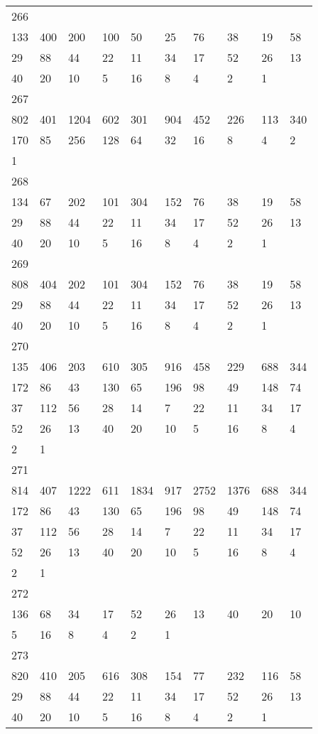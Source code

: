 \begin{longtable}{*{10}{l}}
266&&&&&&&&&\\
133& 400& 200& 100& 50& 25& 76& 38& 19& 58\\
29& 88& 44& 22& 11& 34& 17& 52& 26& 13\\
40& 20& 10& 5& 16& 8& 4& 2& 1& \\

267&&&&&&&&&\\
802& 401& 1204& 602& 301& 904& 452& 226& 113& 340\\
170& 85& 256& 128& 64& 32& 16& 8& 4& 2\\
1& \\

268&&&&&&&&&\\
134& 67& 202& 101& 304& 152& 76& 38& 19& 58\\
29& 88& 44& 22& 11& 34& 17& 52& 26& 13\\
40& 20& 10& 5& 16& 8& 4& 2& 1& \\

269&&&&&&&&&\\
808& 404& 202& 101& 304& 152& 76& 38& 19& 58\\
29& 88& 44& 22& 11& 34& 17& 52& 26& 13\\
40& 20& 10& 5& 16& 8& 4& 2& 1& \\

270&&&&&&&&&\\
135& 406& 203& 610& 305& 916& 458& 229& 688& 344\\
172& 86& 43& 130& 65& 196& 98& 49& 148& 74\\
37& 112& 56& 28& 14& 7& 22& 11& 34& 17\\
52& 26& 13& 40& 20& 10& 5& 16& 8& 4\\
2& 1& \\

271&&&&&&&&&\\
814& 407& 1222& 611& 1834& 917& 2752& 1376& 688& 344\\
172& 86& 43& 130& 65& 196& 98& 49& 148& 74\\
37& 112& 56& 28& 14& 7& 22& 11& 34& 17\\
52& 26& 13& 40& 20& 10& 5& 16& 8& 4\\
2& 1& \\

272&&&&&&&&&\\
136& 68& 34& 17& 52& 26& 13& 40& 20& 10\\
5& 16& 8& 4& 2& 1& \\

273&&&&&&&&&\\
820& 410& 205& 616& 308& 154& 77& 232& 116& 58\\
29& 88& 44& 22& 11& 34& 17& 52& 26& 13\\
40& 20& 10& 5& 16& 8& 4& 2& 1& \\


\end{longtable}
